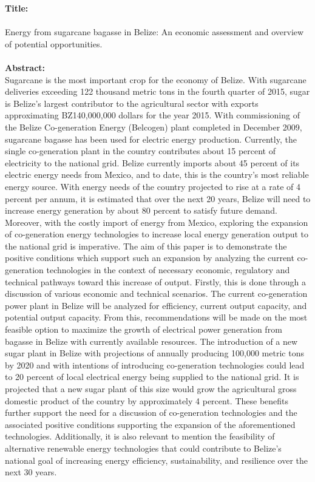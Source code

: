 \documentclass[12pt]{article}
\begin{document}
\noindent
\textbf{Title:} \\
\\Energy from sugarcane bagasse in Belize: An economic assessment and overview of potential opportunities. \\ \\
\noindent\textbf{Abstract:}\\
Sugarcane is the most important crop for the economy of Belize. With sugarcane deliveries exceeding 122 thousand metric tons in the fourth quarter of 2015, sugar is Belize's largest contributor to the agricultural sector with exports approximating BZ140,000,000 dollars for the year 2015. With commissioning of the Belize Co-generation Energy (Belcogen) plant completed in December 2009, sugarcane bagasse has been used for electric energy production. Currently, the single co-generation plant in the country contributes about 15 percent of electricity to the national grid. Belize currently imports about 45 percent of its electric energy needs from Mexico, and to date, this is the country's most reliable energy source. With energy needs of the country projected to rise at a rate of 4 percent per annum, it is estimated that over the next 20 years, Belize will need to increase energy generation by about 80 percent to satisfy future demand. Moreover, with the costly import of energy from Mexico, exploring the expansion of co-generation energy technologies to increase local energy generation output to the national grid is imperative. The aim of this paper is to demonstrate the positive conditions which support such an expansion by analyzing the current co-generation technologies in the context of necessary economic, regulatory and technical pathways toward this increase of output. Firstly, this is done through a discussion of various economic and technical scenarios. The current co-generation power plant in Belize will be analyzed for efficiency, current output capacity, and potential output capacity. From this, recommendations will be made on the most feasible option to maximize the growth of electrical power generation from bagasse in Belize with currently available resources. The introduction of a new sugar plant in Belize with projections of annually producing 100,000 metric tons by 2020 and with intentions of introducing co-generation technologies could lead to 20 percent of local electrical energy being supplied to the national grid. It is projected that a new sugar plant of this size would grow the agricultural gross domestic product of the country by approximately 4 percent. These benefits further support the need for a discussion of co-generation technologies and the associated positive conditions supporting the expansion of the aforementioned technologies. Additionally, it is also relevant to mention the feasibility of alternative renewable energy technologies that could contribute to Belize's national goal of increasing energy efficiency, sustainability, and resilience over the next 30 years. 
\end{document}
